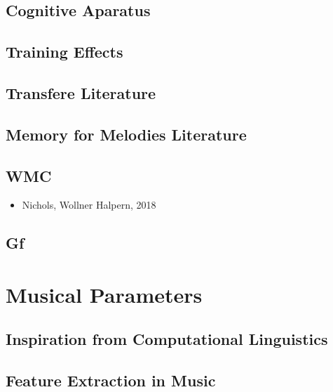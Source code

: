 \documentclass[]{book}
\providecommand{\tightlist}{%
  \setlength{\itemsep}{0pt}\setlength{\parskip}{0pt}}
\theoremstyle{definition}
\theoremstyle{definition}
\theoremstyle{definition}
\theoremstyle{remark}
\begin{document}
\hypertarget{cognitive-aparatus}{%
\section{Cognitive Aparatus}\label{cognitive-aparatus}}

\hypertarget{training-effects}{%
\section{Training Effects}\label{training-effects}}

\hypertarget{transfere-literature}{%
\section{Transfere Literature}\label{transfere-literature}}

\hypertarget{memory-for-melodies-literature}{%
\section{Memory for Melodies
Literature}\label{memory-for-melodies-literature}}

\hypertarget{wmc}{%
\section{WMC}\label{wmc}}

\begin{itemize}
\tightlist
\item
  Nichols, Wollner Halpern, 2018
\end{itemize}

\hypertarget{gf}{%
\section{Gf}\label{gf}}

\hypertarget{musical-parameters}{%
\chapter{Musical Parameters}\label{musical-parameters}}

\hypertarget{inspiration-from-computational-linguistics}{%
\section{Inspiration from Computational
Linguistics}\label{inspiration-from-computational-linguistics}}

\hypertarget{feature-extraction-in-music}{%
\section{Feature Extraction in
Music}\label{feature-extraction-in-music}}
\end{document}
